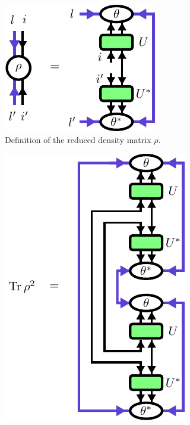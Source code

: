 \begin{figure}
	\centering
	\includegraphics[scale=1]{figures/tikz/disoTPS/rho_definition/rho_definition.pdf}
	\caption{Definition of the reduced density matrix $\rho$.}
	\label{fig:disentangling_rho_definition}
\end{figure}
\begin{figure}
	\centering
	\subcaptionbox{\label{fig:disentangling_evenbly_vidal_algorithm_trace_rho_squared}}
	{%
		\includegraphics[scale=1]{figures/tikz/disoTPS/evenbly_vidal_renyi_2/evenbly_vidal_renyi_2_a.pdf}
	}
	\quad\quad\quad\quad
	\subcaptionbox{\label{fig:disentangling_evenbly_vidal_algorithm_environment_definition}}
	{%
}
\end{figure}
